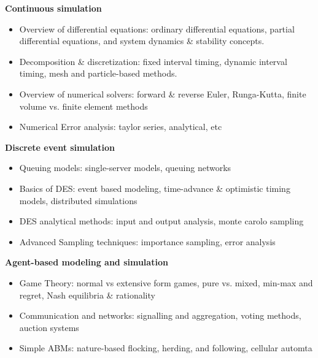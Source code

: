 \documentclass[paper=letter, fontsize=12pt]{article}
\begin{document}
\textbf{Continuous simulation}
\begin{itemize}\setlength\itemsep{-0.6em}
\item Overview of differential equations: ordinary differential equations, partial differential equations, and system dynamics \& stability concepts.
\item Decomposition \& discretization: fixed interval timing, dynamic interval timing, mesh and particle-based methods.
\item Overview of numerical solvers: forward \& reverse Euler, Runga-Kutta, finite volume vs. finite element methods
\item Numerical Error analysis: taylor series, analytical, etc
\end{itemize}

\textbf{Discrete event simulation}
\begin{itemize}\setlength\itemsep{-0.6em}
	\item Queuing models: single-server models, queuing networks
	\item Basics of DES: event based modeling, time-advance \& optimistic timing models, distributed simulations
	\item DES analytical methods: input and output analysis, monte carolo sampling
	\item Advanced Sampling techniques: importance sampling, error analysis
\end{itemize}

\textbf{Agent-based modeling and simulation}
\begin{itemize}\setlength\itemsep{-0.6em}
	\item Game Theory: normal vs extensive form games, pure vs. mixed, min-max and regret, Nash equilibria \& rationality
	\item Communication and networks: signalling and aggregation, voting methods, auction systems
	\item Simple ABMs: nature-based flocking, herding, and following, cellular automta
\end{itemize}
\end{document}
